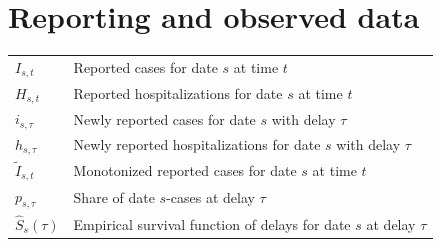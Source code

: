 \section*{Reporting and observed data}
\noindent
\begin{tabular}{@{} p{\symcolwidth} p{\dimexpr\linewidth-\symcolwidth-2\tabcolsep\relax} @{}}
$I_{s,t}$        & Reported cases for date $s$ at time $t$ \\
$H_{s,t}$        & Reported hospitalizations for date $s$ at time $t$ \\
$i_{s,\tau}$     & Newly reported cases for date $s$ with delay $\tau$ \\
$h_{s,\tau}$     & Newly reported hospitalizations for date $s$ with delay $\tau$ \\
$\tilde I_{s,t}$ & Monotonized reported cases for date $s$ at time $t$ \\
$p_{s,\tau}$     & Share of date $s$-cases at delay $\tau$ \\
$\hat S_s(\tau)$ & Empirical survival function of delays for date $s$ at delay $\tau$ \\
\end{tabular}

